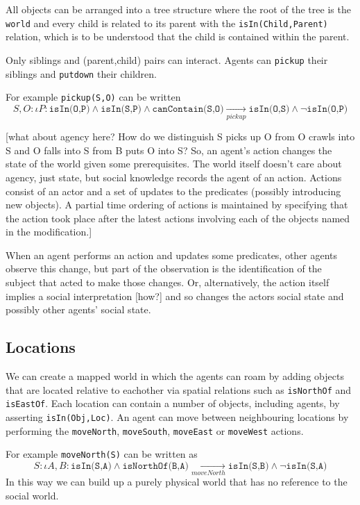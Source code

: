 \documentclass[a4paper]{article}
\begin{document}
All objects can be arranged into a tree structure where the root of the tree is the \texttt{world} and every child is related to its parent with the \texttt{isIn(Child,Parent)} relation, which is to be understood that the child is contained within the parent.

Only siblings and (parent,child) pairs can interact. Agents can \texttt{pickup} their siblings and \texttt{putdown} their children.

For example \texttt{pickup(S,O)} can be written
\begin{dmath}
S,O: \iota P: \texttt{isIn(O,P)} \wedge \texttt{isIn(S,P)} \wedge \texttt{canContain(S,O)} 
\underset{pickup}{\to}
\texttt{isIn(O,S)} \wedge \neg \texttt{isIn(O,P)}
\end{dmath}

[what about agency here? How do we distinguish S picks up O from O crawls into S and O falls into S from B puts O into S? So, an agent's action changes the state of the world given some prerequisites. The world itself doesn't care about agency, just state, but social knowledge records the agent of an action. Actions consist of an actor and a set of updates to the predicates (possibly introducing new objects). A partial time ordering of actions is maintained by specifying that the action took place after the latest actions involving each of the objects named in the modification.]

When an agent performs an action and updates some predicates, other agents observe this change, but part of the observation is the identification of the subject that acted to make those changes. Or, alternatively, the action itself implies a social interpretation [how?] and so changes the actors social state and possibly other agents' social state.

\subsection{Locations}

We can create a mapped world in which the agents can roam by adding objects that are located relative to eachother via spatial relations such as \texttt{isNorthOf} and \texttt{isEastOf}. Each location can contain a number of objects, including agents, by asserting \texttt{isIn(Obj,Loc)}. An agent can move between neighbouring locations by performing the \texttt{moveNorth}, \texttt{moveSouth}, \texttt{moveEast} or \texttt{moveWest} actions.

For example \texttt{moveNorth(S)} can be written as
\[
S:\iota A,B: \texttt{isIn(S,A)} \wedge \texttt{isNorthOf(B,A)} \underset{moveNorth}{\to} \texttt{isIn(S,B)} \wedge \neg \texttt{isIn(S,A)}
\]
In this way we can build up a purely physical world that has no reference to the social world.
\end{document}
